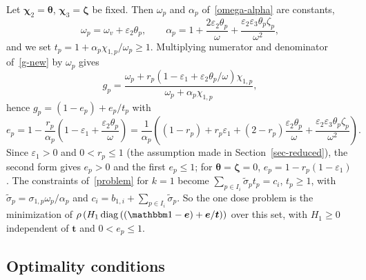 \documentclass[11pt]{article}
\theoremstyle{plain}
\theoremstyle{remark}
\numberwithin{equation}{section}
\begin{document}
Let $\bm\chi_2=\bm\theta$, $\bm\chi_3=\bm\zeta$ be fixed. Then $\omega_p$ and
$\alpha_p$ of~\eqref{omega-alpha} are constants,
\begin{equation}\label{t-def}
\omega_p=\omega_v+\varepsilon_2\theta_p,\qquad
\alpha_p=1+\frac{2\varepsilon_2\theta_p}{\omega}+\frac{\varepsilon_2\varepsilon_3\theta_p\zeta_p}{\omega^2},
\end{equation}
and we set $t_p=1+\alpha_p\chi_{1,p}/\omega_p\ge 1$.
Multiplying numerator and denominator of~\eqref{g-new} by $\omega_p$ gives
\begin{equation*}
g_p=\frac{\omega_p+r_p\left(1-\varepsilon_1+\varepsilon_2\theta_p/\omega\right)\chi_{1,p}}{\omega_p+\alpha_p\chi_{1,p}},
\end{equation*}
hence $g_p=(1-e_p)+e_p/t_p$ with
\begin{equation}\label{e-new}
e_p=1-\frac{r_p}{\alpha_p}\left(1-\varepsilon_1+\frac{\varepsilon_2\theta_p}{\omega}\right)
=\frac{1}{\alpha_p}\left((1-r_p)+r_p\varepsilon_1+(2-r_p)\frac{\varepsilon_2\theta_p}{\omega}
+\frac{\varepsilon_2\varepsilon_3\theta_p\zeta_p}{\omega^2}\right).
\end{equation}
Since $\varepsilon_1>0$ and $0<r_p\le 1$ (the assumption made in
Section~\ref{sec-reduced}), the second form gives $e_p>0$ and the
first $e_p\le 1$; for $\bm\theta=\bm\zeta=0$, $e_p=1-r_p(1-\varepsilon_1)$.
The constraints of~\eqref{problem} for $k=1$ become
$\sum_{p\in I_i}\widetilde\sigma_pt_p=c_i$, $t_p\ge 1$, with
$\widetilde\sigma_p=\sigma_{1,p}\omega_p/\alpha_p$ and
$c_i=b_{1,i}+\sum_{p\in I_i}\widetilde\sigma_p$. So the one dose problem is
the minimization of $\rho\left(H_1\operatorname{diag}\left((\mathbbm 1-\bm e)+\bm e/\bm t\right)\right)$
over this set, with $H_1\ge 0$ independent of $\bm t$ and $0<e_p\le 1$.

\subsection{Optimality conditions}\label{sec-algorithm}
\end{document}
